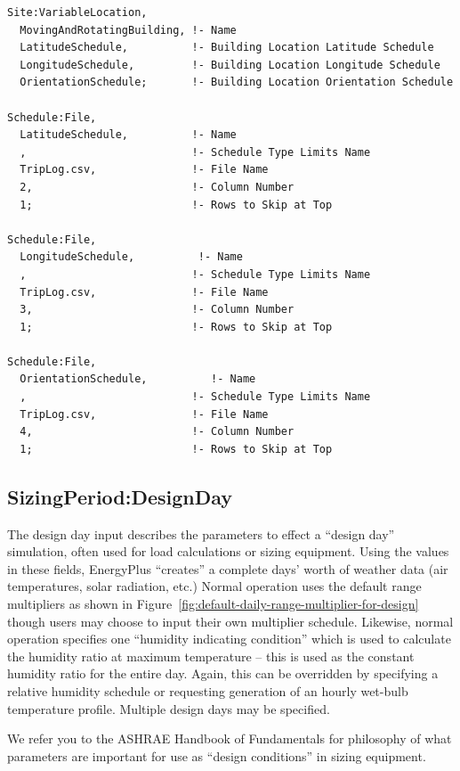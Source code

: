 \begin{lstlisting}
Site:VariableLocation,
  MovingAndRotatingBuilding, !- Name
  LatitudeSchedule,          !- Building Location Latitude Schedule
  LongitudeSchedule,         !- Building Location Longitude Schedule
  OrientationSchedule;       !- Building Location Orientation Schedule

Schedule:File,
  LatitudeSchedule,          !- Name
  ,                          !- Schedule Type Limits Name
  TripLog.csv,               !- File Name
  2,                         !- Column Number
  1;                         !- Rows to Skip at Top

Schedule:File,
  LongitudeSchedule,          !- Name
  ,                          !- Schedule Type Limits Name
  TripLog.csv,               !- File Name
  3,                         !- Column Number
  1;                         !- Rows to Skip at Top

Schedule:File,
  OrientationSchedule,          !- Name
  ,                          !- Schedule Type Limits Name
  TripLog.csv,               !- File Name
  4,                         !- Column Number
  1;                         !- Rows to Skip at Top
\end{lstlisting}

\subsection{SizingPeriod:DesignDay}\label{sizingperioddesignday}

The design day input describes the parameters to effect a ``design day'' simulation, often used for load calculations or sizing equipment. Using the values in these fields, EnergyPlus ``creates'' a complete days' worth of weather data (air temperatures, solar radiation, etc.) Normal operation uses the default range multipliers as shown in Figure~\ref{fig:default-daily-range-multiplier-for-design} though users may choose to input their own multiplier schedule. Likewise, normal operation specifies one ``humidity indicating condition'' which is used to calculate the humidity ratio at maximum temperature -- this is used as the constant humidity ratio for the entire day. Again, this can be overridden by specifying a relative humidity schedule or requesting generation of an hourly wet-bulb temperature profile. Multiple design days may be specified.

We refer you to the ASHRAE Handbook of Fundamentals for philosophy of what parameters are important for use as ``design conditions'' in sizing equipment.

